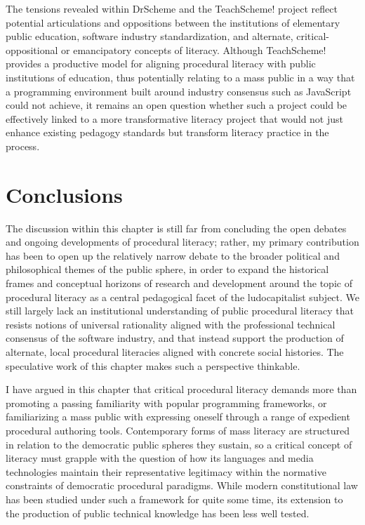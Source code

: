 The tensions revealed within DrScheme and the TeachScheme! project reflect potential articulations and oppositions between the institutions of elementary public education, software industry standardization, and alternate, critical-oppositional or emancipatory concepts of literacy. Although TeachScheme! provides a productive model for aligning procedural literacy with public institutions of education, thus potentially relating to a mass public in a way that a programming environment built around industry consensus such as JavaScript could not achieve, it remains an open question whether such a project could be effectively linked to a more transformative literacy project that would not just enhance existing pedagogy standards but transform literacy practice in the process.

\section{Conclusions}

The discussion within this chapter is still far from concluding the open debates and ongoing developments of procedural literacy; rather, my primary contribution has been to open up the relatively narrow debate to the broader political and philosophical themes of the public sphere, in order to expand the historical frames and conceptual horizons of research and development around the topic of procedural literacy as a central pedagogical facet of the ludocapitalist subject. We still largely lack an institutional understanding of public procedural literacy that resists notions of universal rationality aligned with the professional technical consensus of the software industry, and that instead support the production of alternate, local procedural literacies aligned with concrete social histories. The speculative work of this chapter makes such a perspective thinkable.

I have argued in this chapter that critical procedural literacy demands more than promoting a passing familiarity with popular programming frameworks, or familiarizing a mass public with expressing oneself through a range of expedient procedural authoring tools. Contemporary forms of mass literacy are structured in relation to the democratic public spheres they sustain, so a critical concept of literacy must grapple with the question of how its languages and media technologies maintain their representative legitimacy within the normative constraints of democratic procedural paradigms. While modern constitutional law has been studied under such a framework for quite some time, its extension to the production of public technical knowledge has been less well tested.

